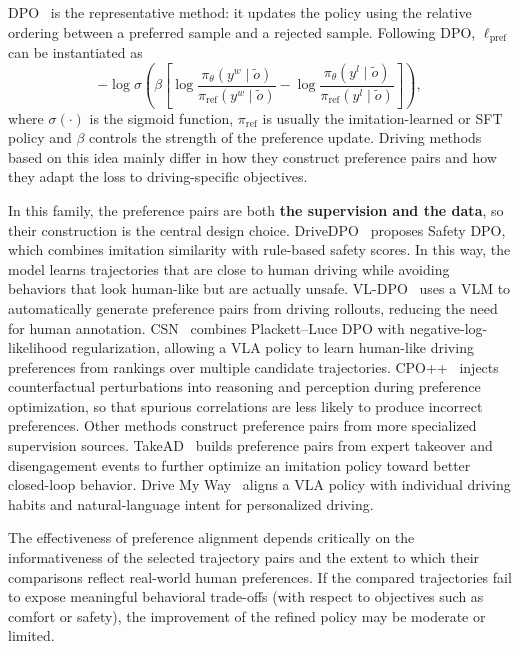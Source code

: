 \documentclass[runningheads]{llncs}
\begin{document}
DPO~\cite{rafailov2023dpo} is the representative method: it updates the policy using the relative ordering between a preferred sample and a rejected sample. Following DPO, $\ell_{\mathrm{pref}}$ can be instantiated as
\[
-\log \sigma
\left(
\beta
\left[
\log
\frac{\pi_\theta(y^w\mid\tilde{o})}
{\pi_{\mathrm{ref}}(y^w\mid\tilde{o})}
-
\log
\frac{\pi_\theta(y^l\mid\tilde{o})}
{\pi_{\mathrm{ref}}(y^l\mid\tilde{o})}
\right]
\right),
\]
where $\sigma(\cdot)$ is the sigmoid function, $\pi_{\mathrm{ref}}$ is usually the imitation-learned or SFT policy and $\beta$ controls the strength of the preference update. Driving methods based on this idea mainly differ in how they construct preference pairs and how they adapt the loss to driving-specific objectives.



In this family, the preference pairs are both \textbf{the supervision and the data}, so their construction is the central design choice. DriveDPO~\cite{drivedpo2025} proposes Safety DPO, which combines imitation similarity with rule-based safety scores. In this way, the model learns trajectories that are close to human driving while avoiding behaviors that look human-like but are actually unsafe. VL-DPO~\cite{vldpo2026} uses a VLM to automatically generate preference pairs from driving rollouts, reducing the need for human annotation. CSN~\cite{csn2026} combines Plackett--Luce DPO with negative-log-likelihood regularization, allowing a VLA policy to learn human-like driving preferences from rankings over multiple candidate trajectories. CPO++~\cite{cpopp2026} injects counterfactual perturbations into reasoning and perception during preference optimization, so that spurious correlations are less likely to produce incorrect preferences. Other methods construct preference pairs from more specialized supervision sources. TakeAD~\cite{takead2025} builds preference pairs from expert takeover and disengagement events to further optimize an imitation policy toward better closed-loop behavior. Drive My Way~\cite{drivemyway2026} aligns a VLA policy with individual driving habits and natural-language intent for personalized driving.

The effectiveness of preference alignment depends critically on the informativeness of the selected trajectory pairs and the extent to which their comparisons reflect real-world human preferences. If the compared trajectories fail to expose meaningful behavioral trade-offs (with respect to objectives such as comfort or safety), the improvement of the refined policy may be moderate or limited. 
\end{document}
